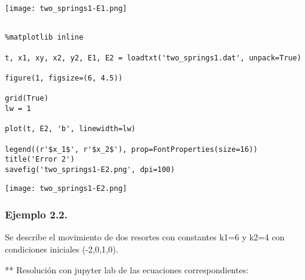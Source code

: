 \documentclass{article} %
\begin{document}
\begin{center}
 	\texttt{[image: two\_springs1-E1.png]}
 \end{center}




\begin{verbatim} 

%matplotlib inline

t, x1, xy, x2, y2, E1, E2 = loadtxt('two_springs1.dat', unpack=True)

figure(1, figsize=(6, 4.5))

grid(True)
lw = 1

plot(t, E2, 'b', linewidth=lw)

legend((r'$x_1$', r'$x_2$'), prop=FontProperties(size=16))
title('Error 2')
savefig('two_springs1-E2.png', dpi=100)

\end{verbatim}



\begin{center}
 	\texttt{[image: two\_springs1-E2.png]}
 \end{center}


\subsubsection{Ejemplo 2.2.}
Se describe el movimiento de dos resortes con constantes k1=6 y k2=4 con condiciones iniciales (-2,0,1,0).

\vspace{0.5 cm}

** Resolución con jupyter lab de las ecuaciones correspondientes:
\end{document}
